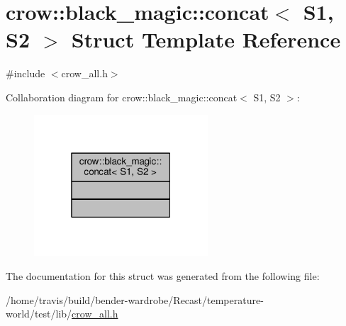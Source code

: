 \hypertarget{structcrow_1_1black__magic_1_1concat}{\section{crow\-:\-:black\-\_\-magic\-:\-:concat$<$ S1, S2 $>$ Struct Template Reference}
\label{structcrow_1_1black__magic_1_1concat}
}


{\ttfamily \#include $<$crow\-\_\-all.\-h$>$}



Collaboration diagram for crow\-:\-:black\-\_\-magic\-:\-:concat$<$ S1, S2 $>$\-:
\nopagebreak
\begin{figure}[H]
\begin{center}
\leavevmode
\includegraphics[width=184pt]{structcrow_1_1black__magic_1_1concat__coll__graph}
\end{center}
\end{figure}


The documentation for this struct was generated from the following file\-:\begin{DoxyCompactItemize}
\item 
/home/travis/build/bender-\/wardrobe/\-Recast/temperature-\/world/test/lib/\hyperlink{crow__all_8h}{crow\-\_\-all.\-h}\end{DoxyCompactItemize}
